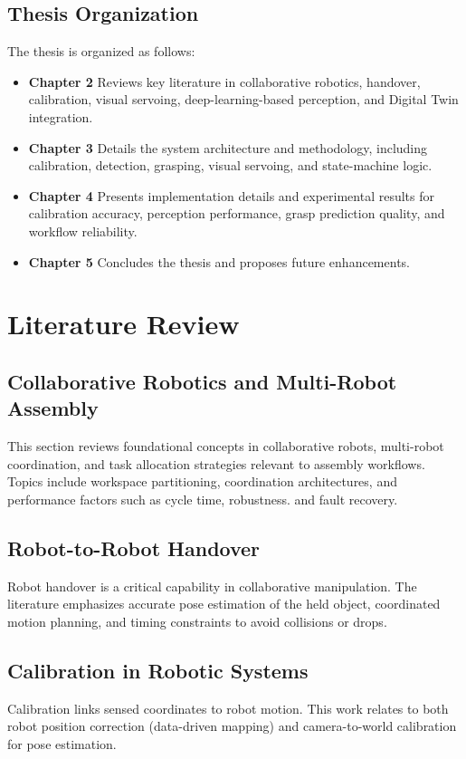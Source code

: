 \documentclass[15pt, a4paper]{extreport}
\begin{document}
\section{Thesis Organization}
The thesis is organized as follows:
\begin{itemize}
    \item \textbf{Chapter 2} Reviews key literature in collaborative robotics, handover, calibration, visual servoing, deep-learning-based perception, and Digital Twin integration.
    \item \textbf{Chapter 3} Details the system architecture and methodology, including calibration, detection, grasping, visual servoing, and state-machine logic.
    \item \textbf{Chapter 4} Presents implementation details and experimental results for calibration accuracy, perception performance, grasp prediction quality, and workflow reliability.
    \item \textbf{Chapter 5} Concludes the thesis and proposes future enhancements.
\end{itemize}

\chapter{Literature Review}

\section{Collaborative Robotics and Multi-Robot Assembly}
This section reviews foundational concepts in collaborative robots, multi-robot coordination, and task allocation strategies relevant to assembly workflows. Topics include workspace partitioning, coordination architectures, and performance factors such as cycle time, robustness. and fault recovery.

\section{Robot-to-Robot Handover}
Robot handover is a critical capability in collaborative manipulation. The literature emphasizes accurate pose estimation of the held object, coordinated motion planning, and timing constraints to avoid collisions or drops.

\section{Calibration in Robotic Systems}
Calibration links sensed coordinates to robot motion. This work relates to both robot position correction (data-driven mapping) and camera-to-world calibration for pose estimation.
\end{document}
